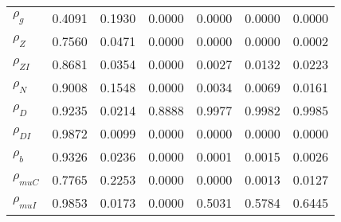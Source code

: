 \begin{center}
\begin{longtable}{lcccccc}
$ {\rho_g}             $	 & 	          0.4091	 & 	          0.1930	 & 	          0.0000	 & 	          0.0000	 & 	          0.0000	 & 	          0.0000 \\ 
$ {\rho_Z}             $	 & 	          0.7560	 & 	          0.0471	 & 	          0.0000	 & 	          0.0000	 & 	          0.0000	 & 	          0.0002 \\ 
$ {\rho_{ZI}}          $	 & 	          0.8681	 & 	          0.0354	 & 	          0.0000	 & 	          0.0027	 & 	          0.0132	 & 	          0.0223 \\ 
$ {\rho_N}             $	 & 	          0.9008	 & 	          0.1548	 & 	          0.0000	 & 	          0.0034	 & 	          0.0069	 & 	          0.0161 \\ 
$ {\rho_D}             $	 & 	          0.9235	 & 	          0.0214	 & 	          0.8888	 & 	          0.9977	 & 	          0.9982	 & 	          0.9985 \\ 
$ {\rho_{DI}}          $	 & 	          0.9872	 & 	          0.0099	 & 	          0.0000	 & 	          0.0000	 & 	          0.0000	 & 	          0.0000 \\ 
$ {\rho_b}             $	 & 	          0.9326	 & 	          0.0236	 & 	          0.0000	 & 	          0.0001	 & 	          0.0015	 & 	          0.0026 \\ 
$ {\rho_{muC}}         $	 & 	          0.7765	 & 	          0.2253	 & 	          0.0000	 & 	          0.0000	 & 	          0.0013	 & 	          0.0127 \\ 
$ {\rho_{muI}}         $	 & 	          0.9853	 & 	          0.0173	 & 	          0.0000	 & 	          0.5031	 & 	          0.5784	 & 	          0.6445 \\ 
\end{longtable}
 \end{center}
